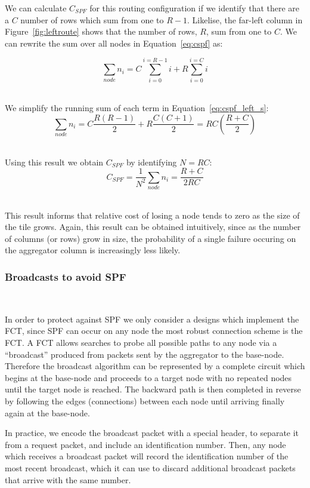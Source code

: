 We can calculate $C_{SPF}$ for this routing configuration if we identify that there are a $C$ number of rows which sum from one to $R-1$.
Likelise, the far-left column in Figure~\ref{fig:leftroute} shows that the number of rows, $R$, sum from one to $C$.
We can rewrite the sum over all nodes in Equation~\ref{eq:cspf} as:

\begin{equation}
  \sum_{node}n_{i} = C\sum_{i=0}^{i=R-1}i + R\sum_{i=0}^{i=C}i
\end{equation}~\label{eq:cspf_left_s}

We simplify the running sum of each term in Equation~\ref{eq:cspf_left_s}:
\begin{equation}
  \sum_{node}n_{i} = C\frac{R(R-1)}{2} + R\frac{C(C+1)}{2} = RC(\frac{R+C}{2})
\end{equation}~\label{eq:cspf_left_e}

Using this result we obtain $C_{SPF}$ by identifying $N = RC$:
\begin{equation}
  C_{SPF} = \frac{1}{N^{2}}\sum_{node}n_{i} = \boxed{\frac{R+C}{2RC}}
\end{equation}~\label{eq:cspf_left_fin}

This result informs that relative cost of losing a node tends to zero as the size of the tile grows.
Again, this result can be obtained intuitively, since as the number of columns (or rows) grow in size, the probability of a single failure occuring on the aggregator column is increasingly less likely.


\subsubsection{Broadcasts to avoid SPF}~\label{sec:broadcast}

In order to protect against SPF we only consider a designs which implement the FCT, since SPF can occur on any node the most robust connection scheme is the FCT.
A FCT allows searches to probe all possible paths to any node via a ``broadcast'' produced from packets sent by the aggregator to the base-node.
Therefore the broadcast algorithm can be represented by a complete circuit which begins at the base-node and proceeds to a target node with no repeated nodes until the target node is reached.
The backward path is then completed in reverse by following the edges (connections) between each node until arriving finally again at the base-node.

In practice, we encode the broadcast packet with a special header, to separate it from a request packet, and include an identification number.
Then, any node which receives a broadcast packet will record the identification number of the most recent broadcast, which it can use to discard additional broadcast packets that arrive with the same number.

